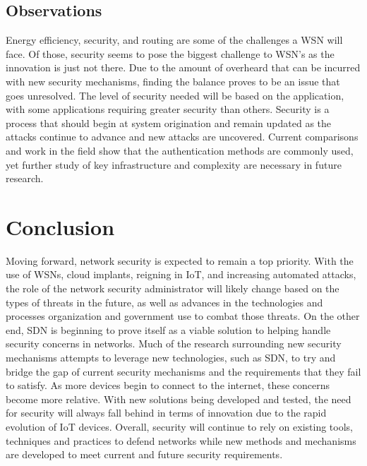 \subsection{Observations}

Energy efficiency, security, and routing are some of the challenges a WSN will face. Of those, security seems to pose the biggest challenge to WSN’s as the innovation is just not there. Due to the amount of overheard that can be incurred with new security mechanisms, finding the balance proves to be an issue that goes unresolved. The level of security needed will be based on the application, with some applications requiring greater security than others. Security is a process that should begin at system origination and remain updated as the attacks continue to advance and new attacks are uncovered. Current comparisons and work in the field show that the authentication methods are commonly used, yet further study of key infrastructure and complexity are necessary in future research.

\section {Conclusion}

Moving forward, network security is expected to remain a top priority. With the use of WSNs, cloud implants, reigning in IoT, and increasing automated attacks, the role of the network security administrator will likely change based on the types of threats in the future, as well as advances in the technologies and processes organization and government use to combat those threats. On the other end, SDN is beginning to prove itself as a viable solution to helping handle security concerns in networks. Much of the research surrounding new security mechanisms attempts to leverage new technologies, such as SDN, to try and bridge the gap of current security mechanisms and the requirements that they fail to satisfy. As more devices begin to connect to the internet, these concerns become more relative. With new solutions being developed and tested, the need for security will always fall behind in terms of innovation due to the rapid evolution of IoT devices. Overall, security will continue to rely on existing tools, techniques and practices to defend networks while new methods and mechanisms are developed to meet current and future security requirements.

